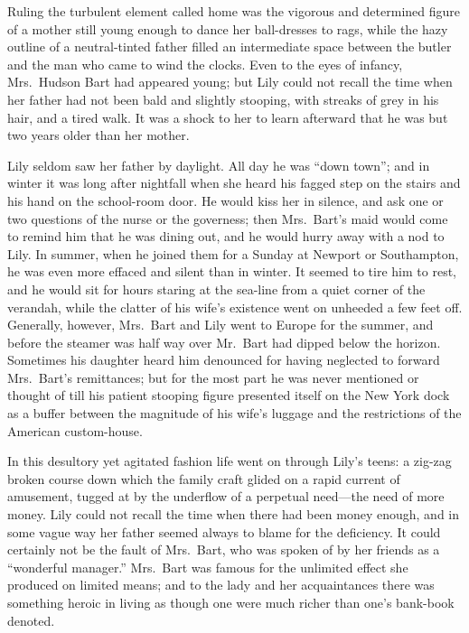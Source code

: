 \documentclass[12pt,a4paper]{book}
\begin{document}
Ruling the turbulent element called home was the vigorous and
determined figure of a mother still young enough to dance her
ball-dresses to rags, while the hazy outline of a neutral-tinted
father filled an intermediate space between the butler and the
man who came to wind the clocks. Even to the eyes of infancy,
Mrs.\ Hudson Bart had appeared young; but Lily could not recall
the time when her father had not been bald and slightly stooping,
with streaks of grey in his hair, and a tired walk. It was a
shock to her to learn afterward that he was but two years older
than her mother.





Lily seldom saw her father by daylight. All day he was ``down
town''; and in winter it was long after nightfall when she heard
his fagged step on the stairs and his hand on the school-room
door. He would kiss her in silence, and ask one or two questions
of the nurse or the governess; then Mrs.\ Bart's maid would
come to remind him that he was dining out, and he would hurry
away with a nod to Lily. In summer, when he joined them for a
Sunday at Newport or Southampton, he was even more effaced and
silent than in winter. It seemed to tire him to rest, and he
would sit for hours staring at the sea-line from a quiet corner
of the verandah, while the clatter of his wife's existence went
on unheeded a few feet off. Generally, however, Mrs.\ Bart and
Lily went to Europe for the summer, and before the steamer was
half way over Mr.\ Bart had dipped below the horizon. Sometimes
his daughter heard him denounced for having neglected to forward
Mrs.\ Bart's remittances; but for the most part he was never
mentioned or thought of till his patient stooping figure
presented itself on the New York dock as a buffer between the
magnitude of his wife's luggage and the restrictions of the
American custom-house.





In this desultory yet agitated fashion life went on through
Lily's teens: a zig-zag broken course down which the family craft
glided on a rapid current of amusement, tugged at by the
underflow of a perpetual need---the need of more money. Lily could
not recall the time when there had been money enough, and in some
vague way her father seemed always to blame for the deficiency. 
It could certainly not be the fault of Mrs.\ Bart, who was spoken
of by her friends as a ``wonderful manager.'' Mrs.\ Bart was famous
for the unlimited effect she produced on limited means; and to
the lady and her acquaintances there was something heroic in
living as though one were much richer than one's bank-book
denoted.
\end{document}
